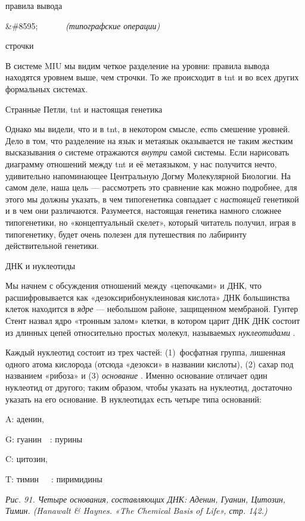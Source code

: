 \documentclass[../main.tex]{subfiles}
\begin{document}
правила вывода

\&\#8595;~~~~~~ \emph{(типографские операции)}

строчки

В системе MIU мы видим четкое разделение на уровни: правила вывода находятся уровнем выше, чем строчки. То же происходит в \acs{tnt} и во всех других формальных системах.

Странные Петли, \acs{tnt} и настоящая генетика

Однако мы видели, что и в \acs{tnt}, в некотором смысле, \emph{есть} смешение уровней. Дело в том, что разделение на язык и метаязык оказывается не таким жестким высказывания \emph{о} системе отражаются \emph{внутри} самой системы. Если нарисовать диаграмму отношений между \acs{tnt} и её метаязыком, у нас получится нечто, удивительно напоминающее Центральную Догму Молекулярной Биологии. На самом деле, наша цель --- рассмотреть это сравнение как можно подробнее, для этого мы должны указать, в чем типогенетика совпадает с \emph{настоящей} генетикой и в чем они различаются. Разумеется, настоящая генетика намного сложнее типогенетики, но «концептуальный скелет», который читатель получил, играя в типогенетику, будет очень полезен для путешествия по лабиринту действительной генетики.

ДНК и нуклеотиды

Мы начнем с обсуждения отношений между «цепочками» и ДНК, что расшифровывается как «дезоксирибонуклеиновая кислота» ДНК большинства клеток находится в \emph{ядре} --- небольшом районе, защищенном мембраной. Гунтер Стент назвал ядро «тронным залом» клетки, в котором царит ДНК ДНК состоит из длинных цепей относительно простых молекул, называемых \emph{нуклеотидами} .

Каждый нуклеотид состоит из трех частей: (1)~фосфатная группа, лишенная одного атома кислорода (отсюда «дезокси» в названии кислоты), (2) сахар под названием «рибоза» и (3) \emph{основание} . Именно основание отличает один нуклеотид от другого; таким образом, чтобы указать на нуклеотид, достаточно указать на его основание. В нуклеотидах есть четыре типа оснований:

A: аденин,

G: гуанин~~: пурины

C: цитозин,

T: тимин~~~: пиримидины

\emph{Рис. 91. Четыре основания, составляющих ДНК: Аденин, Гуанин, Цитозин, Тимин. (Hanawalt \& Haynes. «The Chemical Basis of Life», стр. 142.)}
\end{document}
